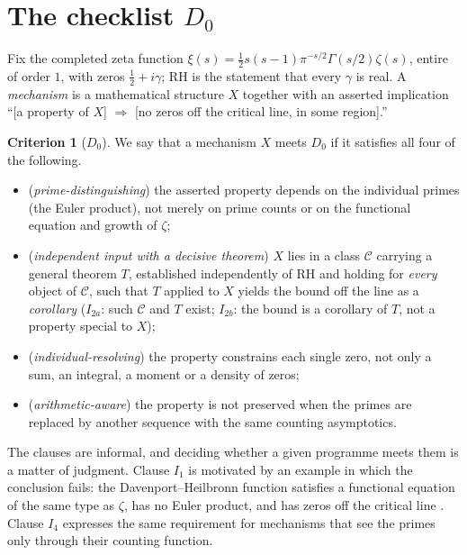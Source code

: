 \documentclass[11pt]{amsart}
\theoremstyle{definition}
\newtheorem{criterion}[theorem]{Criterion}
\theoremstyle{remark}
\begin{document}
\section{The checklist \texorpdfstring{$D_0$}{D0}}\label{sec:disc}

Fix the completed zeta function
$\xi(s)=\tfrac12 s(s-1)\pi^{-s/2}\Gamma(s/2)\zeta(s)$, entire of order $1$,
with zeros $\tfrac12+i\gamma$; RH is the statement that every $\gamma$ is
real. A \emph{mechanism} is a mathematical structure $X$ together with an
asserted implication ``[a property of $X$] $\Rightarrow$ [no zeros off the
critical line, in some region].''

\begin{criterion}[$D_0$]\label{crit:d0}
We say that a mechanism $X$ meets $D_0$ if it satisfies all four of the
following.
\begin{itemize}
\item[$I_1$] (\emph{prime-distinguishing}) the asserted property depends on the
individual primes (the Euler product), not merely on prime counts or on the
functional equation and growth of $\zeta$;
\item[$I_2$] (\emph{independent input with a decisive theorem}) $X$ lies in a
class $\mathcal C$ carrying a general theorem $T$, established independently of
RH and holding for \emph{every} object of $\mathcal C$, such that $T$ applied
to $X$ yields the bound off the line as a \emph{corollary} ($I_{2a}$: such
$\mathcal C$ and $T$ exist; $I_{2b}$: the bound is a corollary of $T$, not a
property special to $X$);
\item[$I_3$] (\emph{individual-resolving}) the property constrains each single
zero, not only a sum, an integral, a moment or a density of zeros;
\item[$I_4$] (\emph{arithmetic-aware}) the property is not preserved when the
primes are replaced by another sequence with the same counting asymptotics.
\end{itemize}
\end{criterion}

The clauses are informal, and deciding whether a given programme meets them is
a matter of judgment. Clause $I_1$ is motivated by an example in which the
conclusion fails: the Davenport--Heilbronn function satisfies a functional
equation of the same type as $\zeta$, has no Euler product, and has zeros off
the critical line \cite[\S10.25]{bgTitchmarsh}. Clause $I_4$ expresses the same
requirement for mechanisms that see the primes only through their counting
function.
\end{document}
